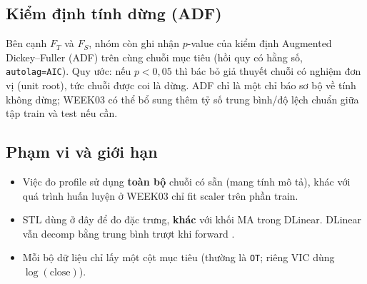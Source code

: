 \subsection{Kiểm định tính dừng (ADF)}

Bên cạnh \(F_T\) và \(F_S\), nhóm còn ghi nhận \(p\)-value của kiểm định
Augmented Dickey--Fuller (ADF) trên cùng chuỗi mục tiêu (hồi quy có hằng số,
\texttt{autolag=AIC}). Quy ước: nếu \(p < 0{,}05\) thì bác bỏ giả thuyết
chuỗi có nghiệm đơn vị (unit root), tức chuỗi được coi là dừng.
ADF chỉ là một chỉ báo sơ bộ về tính không dừng; WEEK03 có thể bổ sung thêm
tỷ số trung bình/độ lệch chuẩn giữa tập train và test nếu cần.

\subsection{Phạm vi và giới hạn}

\begin{itemize}
  \item Việc đo profile sử dụng \textbf{toàn bộ} chuỗi có sẵn (mang tính mô tả),
        khác với quá trình huấn luyện ở WEEK03 chỉ fit scaler trên phần train.
  \item STL dùng ở đây để đo đặc trưng, \textbf{khác} với khối MA trong DLinear.
        DLinear vẫn decomp bằng trung bình trượt khi forward \cite{zeng2023ltsf}.
  \item Mỗi bộ dữ liệu chỉ lấy một cột mục tiêu (thường là \texttt{OT};
        riêng VIC dùng \(\log(\mathrm{close})\)).
\end{itemize}
